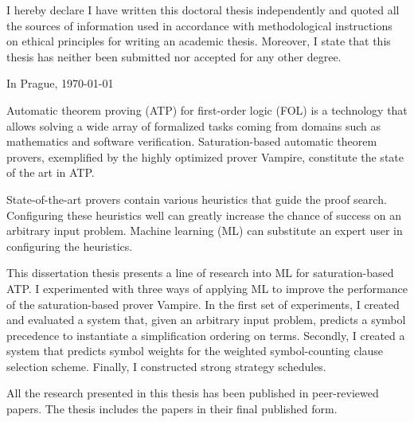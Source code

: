 \begin{declaration}
I hereby declare I have written this doctoral thesis independently and quoted all the sources of information used in accordance with methodological instructions on ethical principles for writing an academic thesis. Moreover, I state that this thesis has neither been submitted nor accepted for any other degree.

In Prague, \today
\end{declaration}

\begin{abstract-english}

Automatic theorem proving (ATP) for first-order logic (FOL) is a technology that allows solving a wide array of formalized tasks
coming from domains such as mathematics and software verification.
Saturation-based automatic theorem provers,
exemplified by the highly optimized prover Vampire,
constitute the state of the art in ATP.

State-of-the-art provers contain various heuristics that guide the proof search.
Configuring these heuristics well can greatly increase the chance of success on an arbitrary input problem.
Machine learning (ML) can substitute an expert user in configuring the heuristics.

This dissertation thesis presents a line of research into ML for saturation-based ATP.
I experimented with three ways of applying ML to improve the performance of the saturation-based prover Vampire.
In the first set of experiments, I created and evaluated a system that, given an arbitrary input problem, predicts a symbol precedence to instantiate a simplification ordering on terms.
Secondly, I created a system that predicts symbol weights for the weighted symbol-counting clause selection scheme.
Finally, I constructed strong strategy schedules.

All the research presented in this thesis has been published in peer-reviewed papers.
The thesis includes the papers in their final published form.

\end{abstract-english}

\begin{abstract-czech}
\end{abstract-czech}


\hypersetup{hidelinks}
